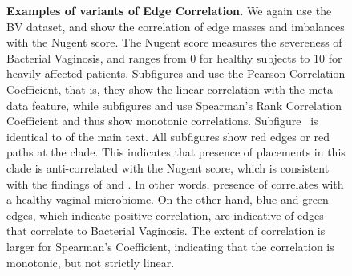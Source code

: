 \begin{figure}[hpbt]
    \centering
    \begin{subfigure}{0pt}
        \label{fig:all_nugent:sub:pcc_em}
    \end{subfigure}
    \begin{subfigure}{0pt}
        \label{fig:all_nugent:sub:pcc_ei}
    \end{subfigure}
    \begin{subfigure}{0pt}
        \label{fig:all_nugent:sub:srcc_em}
    \end{subfigure}
    \begin{subfigure}{0pt}
        \label{fig:all_nugent:sub:srcc_ei}
    \end{subfigure}
    \caption[Examples of variants of Edge Correlation]{
        \textbf{Examples of variants of Edge Correlation.}
        We again use the \ac{BV} dataset, and show the correlation of edge masses and imbalances with the Nugent score.
        The Nugent score measures the severeness of Bacterial Vaginosis,
        and ranges from \num{0} for healthy subjects to \num{10} for heavily affected patients.
        Subfigures  and  use the
        Pearson Correlation Coefficient, that is, they show the linear correlation with the meta-data feature,
        while subfigures  and  use
        Spearman's Rank Correlation Coefficient and thus show monotonic correlations.
        Subfigure~ is identical to  of the main text.
        All subfigures show red edges or red paths at the  clade.
        This indicates that presence of placements in this clade is anti-correlated with the Nugent score,
        which is consistent with the findings of \cite{Srinivasan2012} and \cite{Matsen2011a}.
        In other words, presence of  correlates with a healthy vaginal microbiome.
        On the other hand, blue and green edges, which indicate positive correlation,
        are indicative of edges that correlate to Bacterial Vaginosis.
        The extent of correlation is larger for Spearman's Coefficient,
        indicating that the correlation is monotonic, but not strictly linear.
    }
    \label{fig:all_nugent}
\end{figure}

